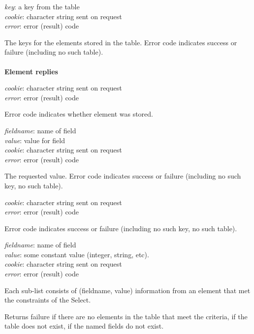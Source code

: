 {
\metP
    {\em key}: a key from the table\\
    {\em cookie}: character string sent on request\\
    {\em error}: error (result) code

\metD
    The keys for the elements stored in the table. Error code indicates
    success or failure (including no such table).  

}

\paragraph{}
{\bf Element replies}

{
\metP
    {\em cookie}: character string sent on request\\
    {\em error}: error (result) code

\metD
    Error code indicates whether element was stored.
}

{
\metP
    {\em fieldname}: name of field\\
    {\em value}: value for field\\
    {\em cookie}: character string sent on request\\
    {\em error}: error (result) code

\metD
    The requested value. Error code indicates success or failure
    (including no such key, no such table).
}

{
\metP
    {\em cookie}: character string sent on request\\
    {\em error}: error (result) code

\metD
    Error code indicates success or failure (including no such key, no
    such table).  
}

{ 
\metP
    {\em fieldname}: name of field\\
    {\em value}: some constant value (integer, string, etc).\\
    {\em cookie}: character string sent on request\\
    {\em error}: error (result) code

\metD
    Each sub-list consists of (fieldname, value) information from an element
    that met the constraints of the Select. 

    Returns failure if there are no elements in the table that meet the
    criteria, if the table does not exist, if the named fields do not exist.
}

